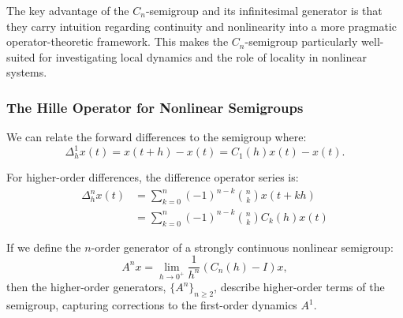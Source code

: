 \documentclass{article}
\begin{document}
The key advantage of the $C_n$-semigroup and its infinitesimal generator is that they carry intuition regarding continuity and nonlinearity into a more pragmatic operator-theoretic framework. This makes the $C_n$-semigroup particularly well-suited for investigating local dynamics and the role of locality in nonlinear systems.

\subsubsection{The Hille Operator for Nonlinear Semigroups}

We can relate the forward differences to the semigroup where:
$$
    \Delta_h^1 x(t) = x(t+h) - x(t) = C_1(h) x(t) - x(t).
$$ 

For higher-order differences, the difference operator series is:
\begin{align}
    \Delta_h^n x(t) &= \sum_{k=0}^n (-1)^{n-k} {n \choose k} x(t+kh) \nonumber \\
    &= \sum_{k=0}^n (-1)^{n-k} {n \choose k} C_k(h) x(t) \label{eq:delta_c}
\end{align}

If we define the $n$-order generator of a strongly continuous nonlinear semigroup:
$$
    A^n x = \lim_{h\rightarrow0^+} \frac{1}{h^n} (C_n(h) - I) x,
$$
then the higher-order generators, $\{A^n\}_{n\geq2}$, describe higher-order terms of the semigroup, capturing corrections to the first-order dynamics \( A^1 \).
\end{document}
